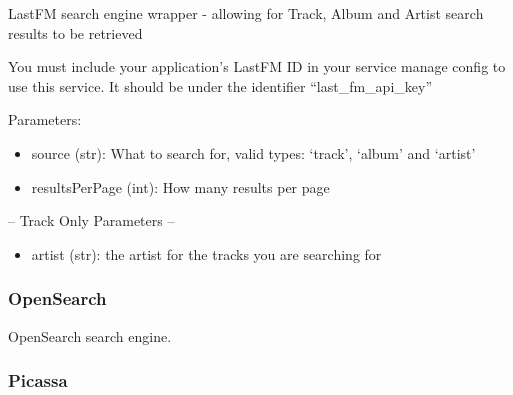 \documentclass[letterpaper,10pt,english]{sphinxmanual}
\begin{document}
\begin{fulllineitems}
\label{api2.0:puppy.search.engine.LastFM}
LastFM search engine wrapper - allowing for Track, Album and Artist search results to be retrieved

You must include your application's LastFM ID in your service manage config to use this service. It should be under the identifier ``last\_fm\_api\_key''

Parameters:
\begin{itemize}
\item {} 
source (str): What to search for, valid types: `track', `album' and `artist'

\item {} 
resultsPerPage (int): How many results per page

\end{itemize}

-- Track Only Parameters --
\begin{itemize}
\item {} 
artist (str): the artist for the tracks you are searching for

\end{itemize}

\end{fulllineitems}



\subsubsection{OpenSearch}
\label{api2.0:opensearch}

\begin{fulllineitems}
\label{api2.0:puppy.search.engine.OpenSearch}
OpenSearch search engine.

\end{fulllineitems}



\subsubsection{Picassa}
\label{api2.0:picassa}
\end{document}
